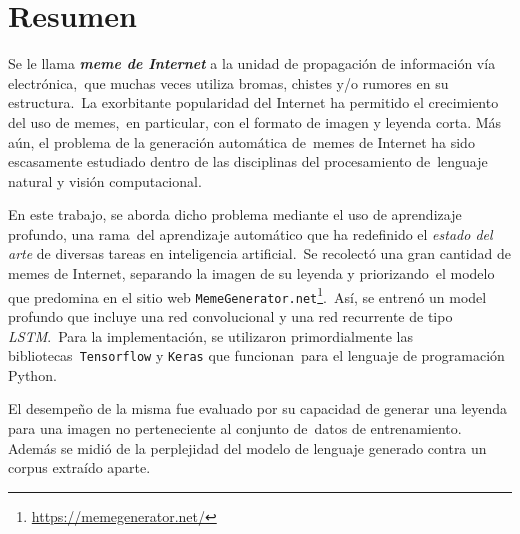 \documentclass[letter]{book}
\newcommand{\twelveptsize}{%
  \fontsize{12}{15}\selectfont}
\begin{document}
\tableofcontents

\mainmatter

\twelveptsize

\chapter*{Resumen}

\noindent
Se le llama \emph{\textbf{meme de Internet}} a la unidad de propagación de información vía electrónica,\
que muchas veces utiliza bromas, chistes y/o rumores en su estructura\cite{shifman2014}.\
La exorbitante popularidad del Internet ha permitido el crecimiento del uso de memes,\
en particular, con el formato de imagen y leyenda corta. Más aún, el problema de la generación automática de\
memes de Internet ha sido escasamente estudiado dentro de las disciplinas del procesamiento de\
lenguaje natural y visión computacional.\par
\noindent
En este trabajo, se aborda dicho problema mediante el uso de aprendizaje profundo, una rama\
del aprendizaje automático que ha redefinido el \emph{estado del arte} de diversas tareas en inteligencia artificial.\
Se recolectó una gran cantidad de memes de Internet, separando la imagen de su leyenda y priorizando\
el modelo que predomina en el sitio web \texttt{MemeGenerator.net}\footnote{\url{https://memegenerator.net/}}.\
Así, se entrenó un model profundo que incluye una red convolucional y una red recurrente de tipo \emph{LSTM}.\
Para la implementación, se utilizaron primordialmente las bibliotecas\
\texttt{Tensorflow}\cite{tensorflow2015-whitepaper} y \texttt{Keras}\cite{chollet2015keras} que funcionan\
para el lenguaje de programación Python.\par
\noindent
El desempeño de la misma fue evaluado por su capacidad de generar una leyenda para una imagen no perteneciente al conjunto de\
datos de entrenamiento. Además se midió de la perplejidad del modelo de lenguaje generado contra un corpus extraído aparte.
\end{document}
